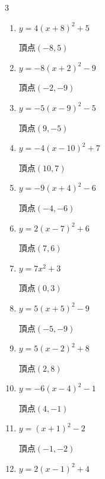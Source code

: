 \begin{multicols}{3}
\begin{enumerate}
  \itemsep=1pt
  \item $\displaystyle y=4\left( x+8\right)^{2}+5$

        $\displaystyle 頂点\left( -8 , 5 \right)$

  \item $\displaystyle y=-8\left( x+2\right)^{2}-9$

        $\displaystyle 頂点\left( -2 , -9 \right)$

  \item $\displaystyle y=-5\left( x-9\right)^{2}-5$

        $\displaystyle 頂点\left( 9 , -5 \right)$

  \item $\displaystyle y=-4\left( x-10\right)^{2}+7$

        $\displaystyle 頂点\left( 10 , 7 \right)$

  \item $\displaystyle y=-9\left( x+4\right)^{2}-6$

        $\displaystyle 頂点\left( -4 , -6 \right)$

  \item $\displaystyle y=2\left( x-7\right)^{2}+6$

        $\displaystyle 頂点\left( 7 , 6 \right)$

  \item $\displaystyle y=7x^{2}+3$

        $\displaystyle 頂点\left( 0 , 3 \right)$

  \item $\displaystyle y=5\left( x+5\right)^{2}-9$

        $\displaystyle 頂点\left( -5 , -9 \right)$

  \item $\displaystyle y=5\left( x-2\right)^{2}+8$

        $\displaystyle 頂点\left( 2 , 8 \right)$

  \item $\displaystyle y=-6\left( x-4\right)^{2}-1$

        $\displaystyle 頂点\left( 4 , -1 \right)$

  \item $\displaystyle y=\left( x+1\right)^{2}-2$

        $\displaystyle 頂点\left( -1 , -2 \right)$

  \item $\displaystyle y=2\left( x-1\right)^{2}+4$


\end{enumerate}
\end{multicols}
